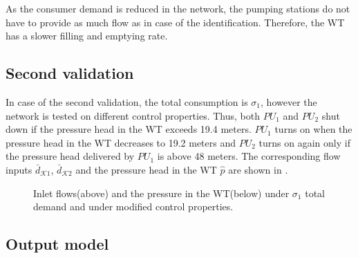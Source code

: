  \vspace{-3mm}

 As the consumer demand is reduced in the network, the pumping stations do not have to provide as much flow as in case of the identification. Therefore, the WT has a slower filling and emptying rate. 

 \subsection{Second validation}
 \label{validation_2}

 In case of the second validation, the total consumption is $\sigma_1$, however the network is tested on different control properties. Thus, both $PU_1$ and $PU_2$ shut down if the pressure head in the WT exceeds 19.4 meters. $PU_1$ turns on when the pressure head in the WT decreases to 19.2 meters and $PU_2$ turns on again only if the pressure head delivered by $PU_1$ is above 48 meters. The corresponding flow inputs $\bar{d}_{\mathcal{K}1}$, $\bar{d}_{\mathcal{K}2}$ and the pressure head in the WT $\hat{p}$ are shown in .

 \vspace{-3mm}

 \begin{figure}[H]
 \centering
  
 \vspace{-2.5mm}
 \end{figure}

 \vspace{-5.5mm}

 \begin{figure}[H]
 \centering
 \hspace{-4.5mm}
  
 \vspace{-2.5mm}
 \caption{Inlet flows(above) and the pressure in the WT(below) under $\sigma_1$ total demand and under modified control properties.}
 \label{fig:identification_example1_v2}
 \end{figure}

 \vspace{-3mm}

 \subsection{Output model}
 \label{output model}

